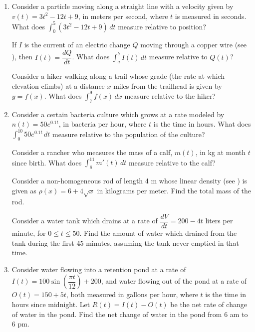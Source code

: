 \documentclass{book}
\newcommand{\dx}{\,dx}
\newcommand{\dt}{\,dt}
\newcommand{\dint}{\displaystyle \int}
\begin{document}
\begin{enumerate}[!HW!]
\item Consider a particle moving along a straight line with a velocity given by $v(t)=3t^2-12t+9$,  in meters per second, where $t$ is measured in seconds. What does $\dint_0^5 (3t^2-12t+9)\dt$ measure relative to position?

\itemspade If $I$ is the current of an electric change $Q$ moving through a copper wire (see ), then $I(t) = \dfrac{dQ}{dt}$. What does $\dint_a^b I(t)\dt$ measure relative to $Q(t)$?


\itemspade Consider a hiker walking along a trail whose grade (the rate at which elevation climbs) at a distance $x$ miles from the trailhead is given by $y=f(x)$. What does $\dint_7^9f(x)\dx$ measure relative to the hiker? 

\item Consider a certain bacteria culture which grows at a rate modeled by $n(t)=50e^{0.1t}$, in bacteria per hour, where $t$ is the time in hours. What does $\dint_{0}^{10}  50e^{0.1t}\dt$ measure relative to the population of the culture?

\itemspade Consider a rancher who measures the mass of a calf, $m(t)$, in kg at month $t$ since birth. What does $\dint_8^{11} m'(t)\dt$ measure relative to the calf? 

\itemspade Consider a non-homogeneous rod of length 4 m whose linear density (see ) is given as $\rho(x)=6+4\sqrt{x}$ in kilograms per meter. Find the total mass of the rod. 

\itemspade Consider a water tank which drains at a rate of $\dfrac{dV}{dt} = 200-4t$ liters per minute, for $0\le t\le 50$. Find the amount of water which drained from the tank during the first 45 minutes, assuming the tank never emptied in that time. 

\item Consider water flowing into a retention pond at a rate of $I(t)=100\sin\left(\dfrac{\pi t}{12}\right)+200$, and water flowing out of the pond at a rate of $O(t)=150+5t$, both measured in gallons per hour, where $t$ is the time in hours since midnight. Let $R(t)=I(t)-O(t)$ be the net rate of change of water in the pond. Find the net change of water in the pond from 6 am to 6 pm.
\end{enumerate}
\end{document}
